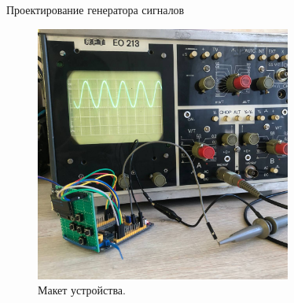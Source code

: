 \documentclass[10pt]{beamer}
\begin{document}
\begin{frame}{Проектирование генератора сигналов}
  \begin{figure}
  \includegraphics[width=0.75\textwidth]{m2}
  \caption{Макет устройства.}
  \end{figure}
\end{frame}
\end{document}
